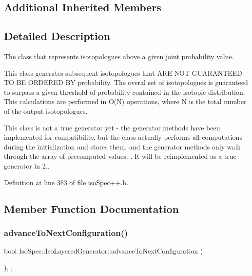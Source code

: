 \subsection*{Additional Inherited Members}


\subsection{Detailed Description}
The class that represents isotopologues above a given joint probability value. 

This class generates subsequent isotopologues that A\+RE N\+OT G\+U\+A\+R\+A\+N\+T\+E\+ED TO BE O\+R\+D\+E\+R\+ED BY probability. The overal set of isotopologues is guaranteed to surpass a given threshold of probability contained in the isotopic distribution. This calculations are performed in O(\+N) operations, where N is the total number of the output isotopologues.

This class is not a true generator yet -\/ the generator methods have been implemented for compatibility, but the class actually performs all computations during the initialization and stores them, and the generator methods only walk through the array of precomputed values. . It will be reimplemented as a true generator in 2.. 

Definition at line 383 of file iso\+Spec++.\+h.



\subsection{Member Function Documentation}
\mbox{\label{class_iso_spec_1_1_iso_layered_generator_abce0871ac279fd54a0344ceb80126b66}} 
\subsubsection{\texorpdfstring{advance\+To\+Next\+Configuration()}{advanceToNextConfiguration()}}
{\footnotesize\ttfamily bool Iso\+Spec\+::\+Iso\+Layered\+Generator\+::advance\+To\+Next\+Configuration (\begin{DoxyParamCaption}{ }\end{DoxyParamCaption})\hspace{0.3cm}{\ttfamily [final]}, {\ttfamily [override]}, {\ttfamily [virtual]}}



